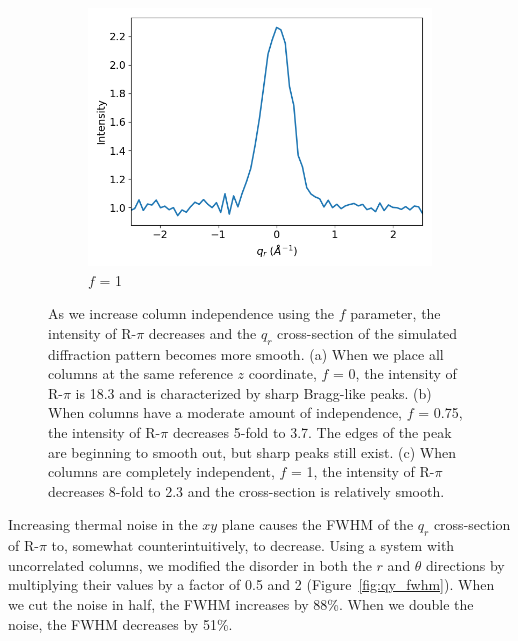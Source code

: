 \documentclass[journal=jpcbfk,manuscript=article]{achemso}
\begin{document}
\begin{figure}
\begin{subfigure}{0.3\textwidth}
  \includegraphics[width=\textwidth]{sf_qy_sr100.png}
  \caption{$f$ = 1}\label{fig:sf_qy_sr100}
  \end{subfigure}
  \caption{As we increase column independence using the $f$ parameter, the
	  intensity of R-$\pi$ decreases and the $q_r$ cross-section of the simulated
	  diffraction pattern becomes more smooth.  (a) When we place all columns at the
	  same reference $z$ coordinate, $f$ = 0, the intensity of R-$\pi$ is 18.3 and is
	  characterized by sharp Bragg-like peaks. (b) When columns have a moderate
	  amount of independence, $f$ = 0.75, the intensity of R-$\pi$ decreases 5-fold
	  to 3.7. The edges of the peak are beginning to smooth out, but sharp peaks
	  still exist. (c) When columns are completely independent, $f$ = 1, the
	  intensity of R-$\pi$ decreases 8-fold to 2.3 and the cross-section is
          relatively smooth.}\label{fig:column_displacement}
  \end{figure}
  
  Increasing thermal noise in the $xy$ plane causes the FWHM of the $q_r$
  cross-section of R-$\pi$ to, somewhat counterintuitively, to decrease. Using a 
  system with uncorrelated columns, we modified the disorder in both the $r$ and
  $\theta$ directions by multiplying their values by a factor of 0.5 and 2 
  (Figure~\ref{fig:qy_fwhm}). When we cut the noise in half, the FWHM increases
  by 88\%. When we double the noise, the FWHM decreases by 51\%.
  
\end{document}
